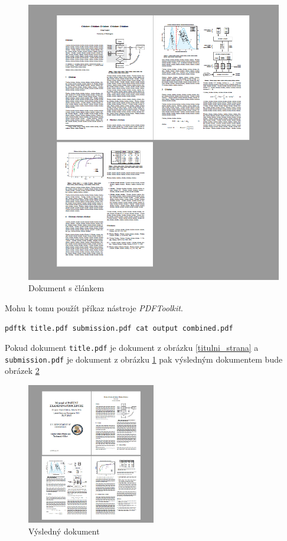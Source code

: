 \documentclass[czech,BP]{thesiskiv}
\begin{document}
\begin{figure}[h]
\begin{minipage}[b]{0.4\textwidth}
    	\includegraphics[width=\textwidth]{obr3.png}
    	\caption{Dokument s článkem}
    	\label{clanek}
    \end{minipage}
\end{figure}
Mohu k tomu použít příkaz nástroje \emph{PDFToolkit}.
\begin{lstlisting}
pdftk title.pdf submission.pdf cat output combined.pdf
\end{lstlisting}
Pokud dokument \texttt{title.pdf} je dokument z obrázku \ref{titulni_strana} a \texttt{submission.pdf} je dokument z obrázku \ref{clanek} pak výsledným dokumentem bude obrázek \ref{kombinace}
\begin{figure}[h]
    \centering
    	\includegraphics[width=0.5\textwidth]{obr5.jpg}
    	\caption{Výsledný dokument}
    	\label{kombinace}
\end{figure}
\end{document}
